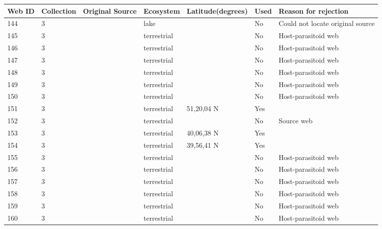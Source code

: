 \documentclass[12pt]{article}
\begin{document}
\begin{landscape}
    \begin{table}[h!]
    \centering
    {\footnotesize
      \begin{tabular}{p{2.8cm}p{1.3cm}p{5.5cm}p{2.2cm}p{2.5cm}lp{3.5cm}}
        \hline
        Web ID & Collection & Original Source & Ecosystem & Latitude(degrees) & Used  & Reason for rejection  \\
        \hline
        144   & 3 & \citet{Snow1958}  & lake  &       & No    & Could not locate original source \\
        145   & 3 & \citet{Rejmanek1979}  & terrestrial &       & No    & Host-parasitoid web \\
        146   & 3 & \citet{Rejmanek1979}  & terrestrial &       & No    & Host-parasitoid web \\
        147   & 3 & \citet{Rejmanek1979}  & terrestrial &       & No    & Host-parasitoid web \\
        148   & 3 & \citet{Rejmanek1979}  & terrestrial &       & No    & Host-parasitoid web \\
        149   & 3 & \citet{Force1974}    & terrestrial &       & No    & Host-parasitoid web \\
        150   & 3 & \citet{Hopkins1984}     & terrestrial &       & No    & Host-parasitoid web \\
        151   & 3 & \citet{Richards1926}     & terrestrial & 51,20,04 N & Yes   &       \\
        152   & 3 & \citet{Whittaker1984}    & terrestrial &       & No    & Source web \\
        153   & 3 & \citet{Mayse1978}    & terrestrial & 40,06,38 N & Yes   &       \\
        154   & 3 & \citet{Mayse1978}    & terrestrial & 39,56,41 N & Yes   &       \\
        155   & 3 & \citet{Askew1975}     & terrestrial &       & No    & Host-parasitoid web \\
        156   & 3 & \citet{Askew1961}     & terrestrial &       & No    & Host-parasitoid web \\
        157   & 3 & \citet{Askew1961}     & terrestrial &       & No    & Host-parasitoid web \\
        158   & 3 & \citet{Askew1961}     & terrestrial &       & No    & Host-parasitoid web \\
        159   & 3 & \citet{Askew1961}     & terrestrial &       & No    & Host-parasitoid web \\
        160   & 3 & \citet{Askew1961}     & terrestrial &       & No    & Host-parasitoid web \\

\end{tabular}}
\end{table}
\end{landscape}
\end{document}

